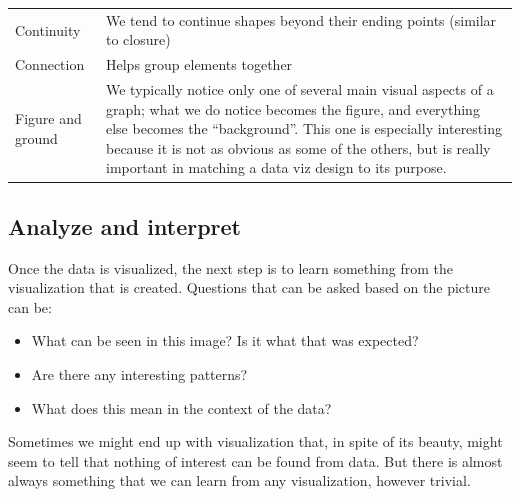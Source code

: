 \documentclass[]{book}
\providecommand{\tightlist}{%
  \setlength{\itemsep}{0pt}\setlength{\parskip}{0pt}}
\theoremstyle{definition}
\theoremstyle{definition}
\theoremstyle{definition}
\theoremstyle{remark}
\begin{document}
\begin{longtable}[]{@{}ll@{}}
\begin{minipage}[t]{0.16\columnwidth}\raggedright\strut
Continuity\strut
\end{minipage} & \begin{minipage}[t]{0.78\columnwidth}\raggedright\strut
We tend to continue shapes beyond their ending points (similar to
closure)\strut
\end{minipage}\tabularnewline
\begin{minipage}[t]{0.16\columnwidth}\raggedright\strut
Connection\strut
\end{minipage} & \begin{minipage}[t]{0.78\columnwidth}\raggedright\strut
Helps group elements together\strut
\end{minipage}\tabularnewline
\begin{minipage}[t]{0.16\columnwidth}\raggedright\strut
Figure and ground\strut
\end{minipage} & \begin{minipage}[t]{0.78\columnwidth}\raggedright\strut
We typically notice only one of several main visual aspects of a graph;
what we do notice becomes the figure, and everything else becomes the
``background''. This one is especially interesting because it is not as
obvious as some of the others, but is really important in matching a
data viz design to its purpose.\strut
\end{minipage}\tabularnewline
\bottomrule
\end{longtable}

\subsection{Analyze and interpret}\label{analyze-and-interpret}

Once the data is visualized, the next step is to learn something from
the visualization that is created. Questions that can be asked based on
the picture can be:

\begin{itemize}
\tightlist
\item
  What can be seen in this image? Is it what that was expected?
\item
  Are there any interesting patterns?
\item
  What does this mean in the context of the data?
\end{itemize}

Sometimes we might end up with visualization that, in spite of its
beauty, might seem to tell that nothing of interest can be found from
data. But there is almost always something that we can learn from any
visualization, however trivial.
\end{document}
